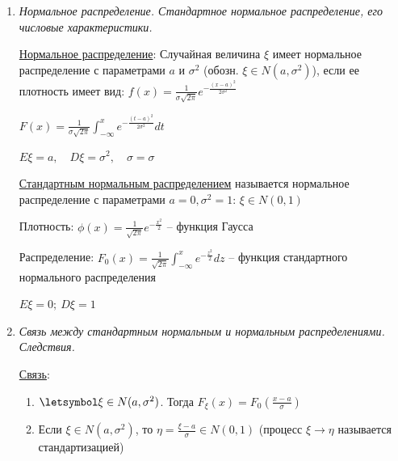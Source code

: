 \begin{enumerate}
    $E\xi = \frac{1}{\alpha}, \quad D\xi = \frac{1}{\alpha^2}, \quad \sigma = \frac{1}{\alpha}$

    $p(\alpha < \xi < \beta) = F(b) - F(a) = e^{-a\alpha} - e^{-b\alpha} \quad\quad\quad a, b \geq 0$

    Из непрерывных случайных величин только показательная обладает свойством нестарения:
    \Ths $\letsymbol \xi \in E_\alpha$. Тогда $p(\xi > x + y \ | \ \xi > x) = p(\xi > y) \quad\quad \forall x, y > 0$

    \item \textit{Нормальное распределение. Стандартное нормальное распределение, его числовые характеристики.}

    \hyperlink{normaldistribution}{Нормальное распределение}: Случайная величина $\xi$ имеет нормальное распределение с параметрами $a$ и $\sigma^2$ (обозн. $\xi \in N(a, \sigma^2)$), если
    ее плотность имеет вид: $f(x) = \frac{1}{\sigma \sqrt{2\pi}} e^{-\frac{(x - a)^2}{2\sigma^2}}$

    $F(x) = \frac{1}{\sigma \sqrt{2\pi}} \int_{-\infty}^x e^{-\frac{(t - a)^2}{2\sigma^2}} dt$

    $E\xi = a, \quad D\xi = \sigma^2, \quad \sigma = \sigma$

    \hyperlink{standardnormaldistribution}{Стандартным нормальным распределением} называется нормальное распределение с параметрами $a = 0, \sigma^2 = 1$: $\xi \in N(0, 1)$

    Плотность: $\phi(x) = \frac{1}{\sqrt{2\pi}} e^{-\frac{x^2}{2}}$ -- функция Гаусса

    Распределение: $F_0(x) = \frac{1}{\sqrt{2\pi}} \int_{-\infty}^x e^{-\frac{z^2}{2}} dz$ -- функция стандартного нормального распределения

    $E\xi = 0; \ D\xi = 1$

    \item \textit{Связь между стандартным нормальным и нормальным распределениями. Следствия.}

    \hyperlink{connectionbetweennormalandstandard}{Связь}: 

    \begin{enumerate}
        \item $\letsymbol \xi \in N(a, \sigma^2)$. Тогда $F_\xi(x) = F_0\left(\frac{x - a}{\sigma}\right)$

        \item Если $\xi \in N(a, \sigma^2)$, то $\eta = \frac{\xi - a}{\sigma} \in N(0, 1)$ (процесс $\xi \to \eta$ называется стандартизацией)


\end{enumerate}
\end{enumerate}
